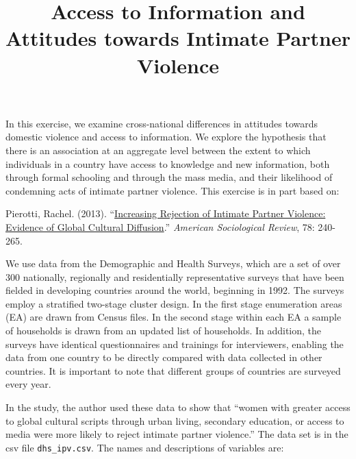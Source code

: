 \documentclass[]{article}
\title{Access to Information and Attitudes towards Intimate Partner Violence}
\author{}
\date{}
\begin{document}
\maketitle


In this exercise, we examine cross-national differences in attitudes
towards domestic violence and access to information. We explore the
hypothesis that there is an association at an aggregate level between
the extent to which individuals in a country have access to knowledge
and new information, both through formal schooling and through the mass
media, and their likelihood of condemning acts of intimate partner
violence. This exercise is in part based on:

Pierotti, Rachel. (2013).
``\href{http://dx.doi.org/10.1177/0003122413480363}{Increasing Rejection
of Intimate Partner Violence: Evidence of Global Cultural Diffusion}.''
\emph{American Sociological Review}, 78: 240-265.

We use data from the Demographic and Health Surveys, which are a set of
over 300 nationally, regionally and residentially representative surveys
that have been fielded in developing countries around the world,
beginning in 1992. The surveys employ a stratified two-stage cluster
design. In the first stage enumeration areas (EA) are drawn from Census
files. In the second stage within each EA a sample of households is
drawn from an updated list of households. In addition, the surveys have
identical questionnaires and trainings for interviewers, enabling the
data from one country to be directly compared with data collected in
other countries. It is important to note that different groups of
countries are surveyed every year.

In the study, the author used these data to show that ``women with
greater access to global cultural scripts through urban living,
secondary education, or access to media were more likely to reject
intimate partner violence.'' The data set is in the csv file
\texttt{dhs\_ipv.csv}. The names and descriptions of variables are:
\end{document}

